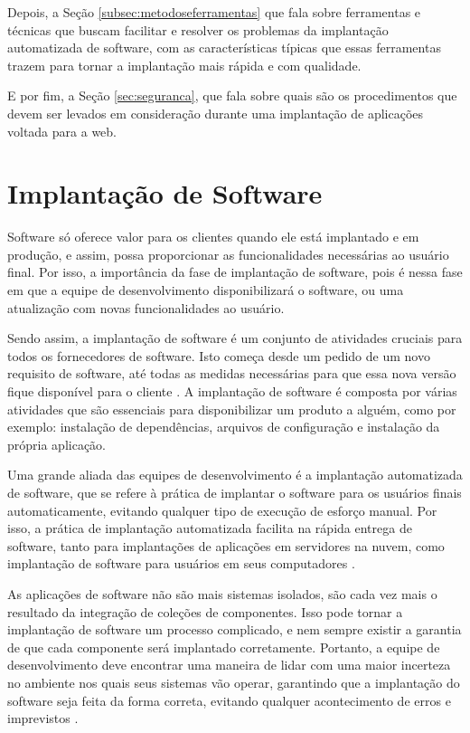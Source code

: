 Depois, a Seção \ref{subsec:metodoseferramentas} que fala sobre
ferramentas e técnicas que buscam facilitar e resolver os problemas da
implantação automatizada de software, com as características típicas que essas
ferramentas trazem para tornar a implantação mais rápida e com qualidade.

E por fim, a Seção \ref{sec:seguranca}, que fala sobre quais são os procedimentos 
que devem ser levados em consideração durante uma implantação de aplicações voltada
para a web.

\section{Implantação de Software}
\label{sec:implantacao}
Software só oferece valor para os clientes quando ele está implantado e em produção,
e assim, possa proporcionar as funcionalidades necessárias ao usuário final. Por
 isso, a importância da fase de implantação de software, pois é nessa fase em que a equipe
de desenvolvimento disponibilizará o software, ou uma atualização com novas funcionalidades
ao usuário. 

Sendo assim, a implantação de software é um conjunto de atividades cruciais
para todos os fornecedores de software. Isto começa desde um pedido de um novo requisito
de software, até todas as medidas necessárias para que essa nova versão fique disponível
para o cliente \cite{5741269}. A implantação de software é composta por várias
atividades que são essenciais para disponibilizar um produto a alguém, como por exemplo:
instalação de dependências, arquivos de configuração e instalação da própria aplicação.

Uma grande aliada das equipes de desenvolvimento é a implantação automatizada de
software, que se refere à prática de implantar o software para os usuários finais
automaticamente, evitando qualquer tipo de execução de esforço manual. Por isso,
a prática de implantação automatizada facilita na rápida entrega de software, tanto
para implantações de aplicações em servidores na nuvem, como implantação de software
para usuários em seus computadores \cite{7284592}.

As aplicações de software não são mais sistemas isolados, 
são cada vez mais o resultado da integração de coleções de
componentes. Isso pode tornar a implantação de software um processo complicado, e
nem sempre existir a garantia de que cada componente será implantado corretamente.
Portanto, a equipe de desenvolvimento deve encontrar uma maneira de lidar
com uma maior incerteza no ambiente nos quais seus sistemas vão operar, garantindo
que a implantação do software seja feita da forma correta, evitando qualquer acontecimento
de erros e imprevistos \cite{deployment1998}.

